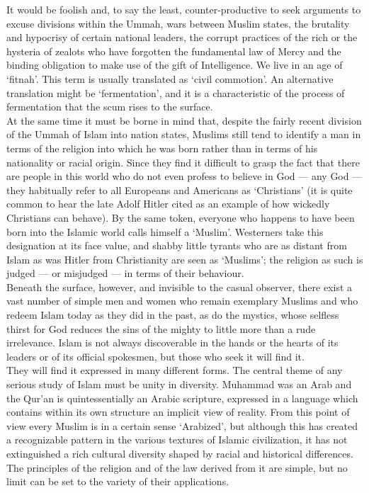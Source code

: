 \documentclass[10pt, twoside,openright]{book}
\begin{document}
It would be foolish and, to say the least, counter\hyp{}productive to seek arguments to excuse divisions within the Ummah, wars between Muslim states, the brutality and hypocrisy of certain national leaders, the corrupt practices of the rich or the hysteria of zealots who have forgotten the fundamental law of Mercy and the binding obligation to make use of the gift of Intelligence. We live in an age of `fitnah'. This term is usually translated as `civil commotion'. An alternative translation might be `fermentation', and it is a characteristic of the process of fermentation that the scum rises to the surface. \\

At the same time it must be borne in mind that, despite the fairly recent division of the Ummah of Islam into nation states, Muslims still tend to identify a man in terms of the religion into which he was born rather than in terms of his nationality or racial origin. Since they find it difficult to grasp the fact that there are people in this world who do not even profess to believe in God --- any God --- they habitually refer to all Europeans and Americans as `Christians' (it is quite common to hear the late Adolf Hitler cited as an example of how wickedly Christians can behave). By the same token, everyone who happens to have been born into the Islamic world calls himself a `Muslim'. Westerners take this designation at its face value, and shabby little tyrants who are as distant from Islam as was Hitler from Christianity are seen as `Muslims'; the religion as such is judged --- or misjudged --- in terms of their behaviour. \\

Beneath the surface, however, and invisible to the casual observer, there exist a vast number of simple men and women who remain exemplary Muslims and who redeem Islam today as they did in the past, as do the mystics, whose selfless thirst for God reduces the sins of the mighty to little more than a rude irrelevance. Islam is not always discoverable in the hands or the hearts of its leaders or of its official spokesmen, but those who seek it will find it. \\

They will find it expressed in many different forms. The central theme of any serious study of Islam must be unity in diversity. Muhammad was an Arab and the Qur'an is quintessentially an Arabic scripture, expressed in a language which contains within its own structure an implicit view of reality. From this point of view every Muslim is in a certain sense `Arabized', but although this has created a recognizable pattern in the various textures of Islamic civilization, it has not extinguished a rich cultural diversity shaped by racial and historical differences. The principles of the religion and of the law derived from it are simple, but no limit can be set to the variety of their applications. \\
\end{document}
